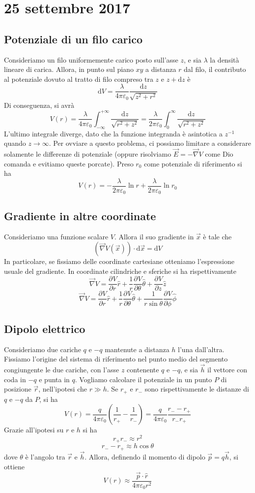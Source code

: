 \documentclass[a4paper,11pt]{book}
\let\oldnabla\nabla
\renewcommand{\nabla}{\vec{\oldnabla}}
\newcommand{\der}[3][]{\frac{\partial ^{#1}#2}{\partial #3^{#1}}}
\newcommand{\dif}{\mathrm{d}}
\let\oldepsilon\epsilon
\let\oldvarepsilon\varepsilon
\renewcommand{\epsilon}{\oldvarepsilon}
\renewcommand{\varepsilon}{\oldepsilon}
\theoremstyle{definition}
\theoremstyle{theorem}
\begin{document}
	\section{25 settembre 2017}
	\subsection{Potenziale di un filo carico}
	Consideriamo un filo uniformemente carico posto sull'asse $z$, e sia $\lambda$ la densità lineare di carica. Allora, in punto sul piano $xy$ a distanza $r$ dal filo, il contributo al potenziale dovuto al tratto di filo compreso tra $z$ e $z+\dif z$ è
	\[\dif V=\frac{\lambda}{4\pi\epsilon_0}\frac{\dif z}{\sqrt{z^2+r^2}}\]
	Di conseguenza, si avrà
	\[V(r)=\frac{\lambda}{4\pi\epsilon_0}\int_{-\infty}^{+\infty}\frac{\dif z}{\sqrt{r^2+z^2}}=\frac{\lambda}{2\pi\epsilon_0}\int_{0}^{\infty}\frac{\dif z}{\sqrt{r^2+z^2}}\]
	L'ultimo integrale diverge, dato che la funzione integranda è asintotica a $z^{-1}$ quando $z\to\infty$. Per ovviare a questo problema, ci possiamo limitare a considerare solamente le differenze di potenziale (oppure risolviamo $\vec{E}=-\nabla V$ come Dio comanda e evitiamo queste porcate). Preso $r_0$ come potenziale di riferimento si ha
	\[V(r)=-\frac{\lambda}{2\pi\epsilon_0}\ln r+\frac{\lambda}{2\pi\epsilon_0}\ln r_0\]
	\subsection{Gradiente in altre coordinate}
	Consideriamo una funzione scalare $V$. Allora il suo gradiente in $\vec{x}$ è tale che
	\[\left(\nabla V(\vec{x})\right)\cdot\dif\vec{x}=\dif V\]
	In particolare, se fissiamo delle coordinate cartesiane otteniamo l'espressione usuale del gradiente. In coordinate cilindriche e sferiche si ha rispettivamente
	\[\nabla V=\der{V}{r}\hat{r}+\frac{1}{r}\der{V}{\theta}\hat{\theta}+\der{V}{z}\hat{z}\]
	\[\nabla V=\der{V}{r}\hat{r}+\frac{1}{r}\der{V}{\theta}\hat{\theta}+\frac{1}{r\sin\theta}\der{V}{\phi}\hat{\phi}\]
	\subsection{Dipolo elettrico}
	Consideriamo due cariche $q$ e $-q$ mantenute a distanza $h$ l'una dall'altra. Fissiamo l'origine del sistema di riferimento nel punto medio del segmento congiungente le due cariche, con l'asse $z$ contenente $q$ e $-q$, e sia $\vec{h}$ il vettore con coda in $-q$ e punta in $q$. Vogliamo calcolare il potenziale in un punto $P$ di posizione $\vec{r}$, nell'ipotesi che $r\gg h$. Se $r_+$ e $r_-$ sono rispettivamente le distanze di $q$ e $-q$ da $P$, si ha
	\[V(r)=\frac{q}{4\pi\epsilon_0}\left(\frac{1}{r_+}-\frac{1}{r_-}\right)=\frac{q}{4\pi\epsilon_0}\frac{r_--r_+}{r_-r_+}\]
	Grazie all'ipotesi su $r$ e $h$ si ha
	\[r_+r_-\approx r^2\]
	\[r_--r_+\approx h\cos\theta\]
	dove $\theta$ è l'angolo tra $\vec{r}$ e $\vec{h}$. Allora, definendo il momento di dipolo $\vec{p}=q\vec{h}$, si ottiene
	\[V(r)\approx\frac{\vec{p}\cdot\hat{r}}{4\pi\epsilon_0r^2}\]
	
\end{document}
